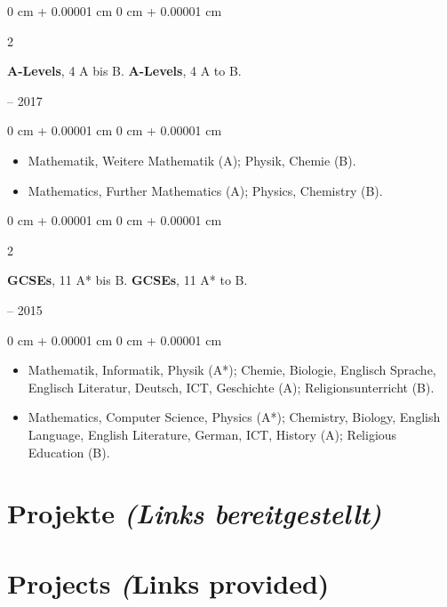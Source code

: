 \documentclass[10pt, letterpaper]{article}
\newenvironment{highlights}{
    \begin{itemize}[
        topsep=0.2 cm,
        parsep=0.2 cm,
        partopsep=0pt,
        itemsep=0.025 cm,
        leftmargin=0 cm + 10pt
    ]
}{
    \end{itemize}
}
\newenvironment{onecolentry}{
    \begin{adjustwidth}{
        0 cm + 0.00001 cm
    }{
        0 cm + 0.00001 cm
    }
}{
    \end{adjustwidth}
}
\newenvironment{twocolentry}[2][]{
    \onecolentry
    \def\secondColumn{#2}
    \setcolumnwidth{\fill, 4.75 cm}
    \begin{paracol}{2}
}{
    \switchcolumn \raggedleft \secondColumn
    \end{paracol}
    \endonecolentry
}
\begin{document}
        \begin{twocolentry}{
            2015 – 2017
        }
            \ifdefined\german
            \textbf{A-Levels}, 4 A bis B.
            \else
            \textbf{A-Levels}, 4 A to B.
            \fi
        \end{twocolentry}

        \vspace{0.10 cm}
        \begin{onecolentry}
            \begin{highlights}
                \ifdefined\german
                \item Mathematik, Weitere Mathematik (A); Physik, Chemie (B).
                \else
                \item Mathematics, Further Mathematics (A); Physics, Chemistry (B).
                \fi
            \end{highlights}
        \end{onecolentry}

        \vspace{0.20 cm}
        \begin{twocolentry}{
            2010 – 2015
        }
            \ifdefined\german
            \textbf{GCSEs}, 11 A* bis B.
            \else
            \textbf{GCSEs}, 11 A* to B.
            \fi
        \end{twocolentry}
        
        \vspace{0.10 cm}
        \begin{onecolentry}
            \begin{highlights}
            \ifdefined\german
            \item Mathematik, Informatik, Physik (A*); Chemie, Biologie, Englisch Sprache, Englisch Literatur, Deutsch, ICT, Geschichte (A); Religionsunterricht (B).
            \else
            \item Mathematics, Computer Science, Physics (A*); Chemistry, Biology, English Language, English Literature, German, ICT, History (A); Religious Education (B).
            \fi
            \end{highlights}
        \end{onecolentry}

    \ifdefined\german
    \section{Projekte \textit{(Links bereitgestellt)}}
    \else
    \section{Projects \textit(Links provided)}
    \fi
\end{document}
